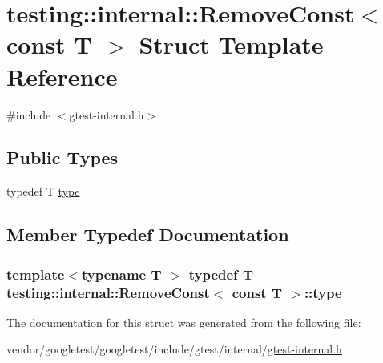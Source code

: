 \hypertarget{structtesting_1_1internal_1_1RemoveConst_3_01const_01T_01_4}{}\section{testing\+:\+:internal\+:\+:Remove\+Const$<$ const T $>$ Struct Template Reference}
\label{structtesting_1_1internal_1_1RemoveConst_3_01const_01T_01_4}


{\ttfamily \#include $<$gtest-\/internal.\+h$>$}

\subsection*{Public Types}
\begin{DoxyCompactItemize}
\item 
typedef T \hyperlink{structtesting_1_1internal_1_1RemoveConst_3_01const_01T_01_4_ac88c6824d228ab05091e5a4f1c1a95fc}{type}
\end{DoxyCompactItemize}


\subsection{Member Typedef Documentation}
\subsubsection[{\texorpdfstring{type}{type}}]{\setlength{\rightskip}{0pt plus 5cm}template$<$typename T $>$ typedef T {\bf testing\+::internal\+::\+Remove\+Const}$<$ const T $>$\+::{\bf type}}\hypertarget{structtesting_1_1internal_1_1RemoveConst_3_01const_01T_01_4_ac88c6824d228ab05091e5a4f1c1a95fc}{}\label{structtesting_1_1internal_1_1RemoveConst_3_01const_01T_01_4_ac88c6824d228ab05091e5a4f1c1a95fc}


The documentation for this struct was generated from the following file\+:\begin{DoxyCompactItemize}
\item 
vendor/googletest/googletest/include/gtest/internal/\hyperlink{gtest-internal_8h}{gtest-\/internal.\+h}\end{DoxyCompactItemize}
